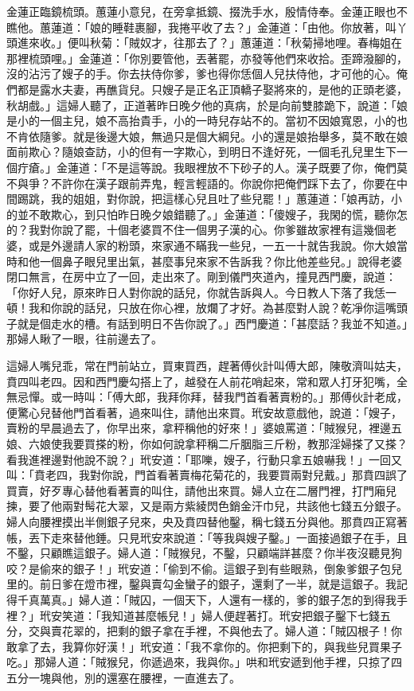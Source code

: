 金蓮正臨鏡梳頭。蕙蓮小意兒，在旁拿抵鏡、掇洗手水，殷情侍奉。金蓮正眼也不瞧他。蕙蓮道：「娘的睡鞋裹腳，我捲平收了去？」金蓮道：「由他。你放著，叫丫頭進來收。」便叫秋菊：「賊奴才，往那去了？」蕙蓮道：「秋菊掃地哩。春梅姐在那裡梳頭哩。」金蓮道：「你別要管他，丟著罷，亦發等他們來收拾。歪蹄潑腳的，沒的沾污了嫂子的手。你去扶侍你爹，爹也得你恁個人兒扶侍他，才可他的心。俺們都是露水夫妻，再醮貨兒。只嫂子是正名正頂轎子娶將來的，是他的正頭老婆，秋胡戲。」這婦人聽了，正道著昨日晚夕他的真病，於是向前雙膝跪下，說道：「娘是小的一個主兒，娘不高抬貴手，小的一時兒存站不的。當初不因娘寬恩，小的也不肯依隨爹。就是後邊大娘，無過只是個大綱兒。小的還是娘抬舉多，莫不敢在娘面前欺心？隨娘查訪，小的但有一字欺心，到明日不逢好死，一個毛孔兒里生下一個疔瘡。」金蓮道：「不是這等說。我眼裡放不下砂子的人。漢子既要了你，俺們莫不與爭？不許你在漢子跟前弄鬼，輕言輕語的。你說你把俺們踩下去了，你要在中間踢跳，我的姐姐，對你說，把這樣心兒且吐了些兒罷！」蕙蓮道：「娘再訪，小的並不敢欺心，到只怕昨日晚夕娘錯聽了。」金蓮道：「傻嫂子，我閑的慌，聽你怎的？我對你說了罷，十個老婆買不住一個男子漢的心。你爹雖故家裡有這幾個老婆，或是外邊請人家的粉頭，來家通不瞞我一些兒，一五一十就告我說。你大娘當時和他一個鼻子眼兒里出氣，甚麼事兒來家不告訴我？你比他差些兒。」說得老婆閉口無言，在房中立了一回，走出來了。剛到儀門夾道內，撞見西門慶，說道：「你好人兒，原來昨日人對你說的話兒，你就告訴與人。今日教人下落了我恁一頓！我和你說的話兒，只放在你心裡，放爛了才好。為甚麼對人說？乾凈你這嘴頭子就是個走水的槽。有話到明日不告你說了。」西門慶道：「甚麼話？我並不知道。」那婦人瞅了一眼，往前邊去了。

這婦人嘴兒乖，常在門前站立，買東買西，趕著傅伙計叫傅大郎，陳敬濟叫姑夫，賁四叫老四。因和西門慶勾搭上了，越發在人前花哨起來，常和眾人打牙犯嘴，全無忌憚。或一時叫：「傅大郎，我拜你拜，替我門首看著賣粉的。」那傅伙計老成，便驚心兒替他門首看著，過來叫住，請他出來買。玳安故意戲他，說道：「嫂子，賣粉的早晨過去了，你早出來，拿秤稱他的好來！」婆娘罵道：「賊猴兒，裡邊五娘、六娘使我要買搽的粉，你如何說拿秤稱二斤胭脂三斤粉，教那淫婦搽了又搽？看我進裡邊對他說不說？」玳安道：「耶嚛，嫂子，行動只拿五娘嚇我！」一回又叫：「賁老四，我對你說，門首看著賣梅花菊花的，我要買兩對兒戴。」那賁四誤了買賣，好歹專心替他看著賣的叫住，請他出來買。婦人立在二層門裡，打門廂兒揀，要了他兩對髩花大翠，又是兩方紫綾閃色銷金汗巾兒，共該他七錢五分銀子。婦人向腰裡摸出半側銀子兒來，央及賁四替他鑿，稱七錢五分與他。那賁四正寫著帳，丟下走來替他錘。只見玳安來說道：「等我與嫂子鑿。」一面接過銀子在手，且不鑿，只顧瞧這銀子。婦人道：「賊猴兒，不鑿，只顧端詳甚麼？你半夜沒聽見狗咬？是偷來的銀子！」玳安道：「偷到不偷。這銀子到有些眼熟，倒象爹銀子包兒里的。前日爹在燈市裡，鑿與賣勾金蠻子的銀子，還剩了一半，就是這銀子。我記得千真萬真。」婦人道：「賊囚，一個天下，人還有一樣的，爹的銀子怎的到得我手裡？」玳安笑道：「我知道甚麼帳兒！」婦人便趕著打。玳安把銀子鑿下七錢五分，交與賣花翠的，把剩的銀子拿在手裡，不與他去了。婦人道：「賊囚根子！你敢拿了去，我算你好漢！」玳安道：「我不拿你的。你把剩下的，與我些兒買果子吃。」那婦人道：「賊猴兒，你遞過來，我與你。」哄和玳安遞到他手裡，只掠了四五分一塊與他，別的還塞在腰裡，一直進去了。

